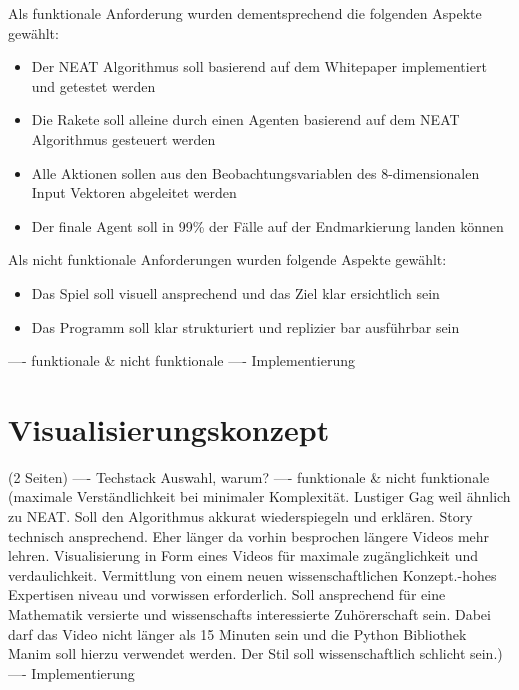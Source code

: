Als funktionale Anforderung wurden dementsprechend die folgenden Aspekte gewählt:
\begin{itemize}
	\item Der NEAT Algorithmus soll basierend auf dem Whitepaper implementiert und getestet werden
	\item Die Rakete soll alleine durch einen Agenten basierend auf dem NEAT Algorithmus gesteuert werden
	\item Alle Aktionen sollen aus den Beobachtungsvariablen des 8-dimensionalen Input Vektoren abgeleitet werden
	\item Der finale Agent soll in 99\% der Fälle auf der Endmarkierung landen können 
\end{itemize}

Als nicht funktionale Anforderungen wurden folgende Aspekte gewählt:
\begin{itemize}
	\item Das Spiel soll visuell ansprechend und das Ziel klar ersichtlich sein
	\item Das Programm soll klar strukturiert und replizier bar ausführbar sein
\end{itemize}

---- funktionale \& nicht funktionale
---- Implementierung  

\section{Visualisierungskonzept}
(2 Seiten)
---- Techstack Auswahl, warum?
---- funktionale \& nicht funktionale (maximale Verständlichkeit bei minimaler Komplexität. Lustiger Gag weil ähnlich zu NEAT. Soll den Algorithmus akkurat wiederspiegeln und erklären. Story technisch ansprechend. Eher länger da vorhin besprochen längere Videos mehr lehren. Visualisierung in Form eines Videos für maximale zugänglichkeit und verdaulichkeit. Vermittlung von einem neuen wissenschaftlichen Konzept.-hohes Expertisen niveau und vorwissen erforderlich. Soll ansprechend für eine Mathematik versierte und wissenschafts interessierte Zuhörerschaft sein. Dabei darf das Video nicht länger als 15 Minuten sein und die Python Bibliothek Manim soll hierzu verwendet werden. Der Stil soll wissenschaftlich schlicht sein.)
---- Implementierung 